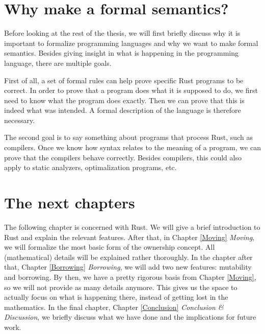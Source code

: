 \section{Why make a formal semantics?}
Before looking at the rest of the thesis, we will first briefly discuss why it is important to formalize programming languages and why we want to make formal semantics. Besides giving insight in what is happening in the programming language, there are multiple goals.

First of all, a set of formal rules can help prove specific Rust programs to be correct. In order to prove that a program does what it is supposed to do, we first need to know what the program does exactly. Then we can prove that this is indeed what was intended. A formal description of the language is therefore necessary. 

The second goal is to say something about programs that process Rust, such as compilers. Once we know how syntax relates to the meaning of a program, we can prove that the compilers behave correctly. Besides compilers, this could also apply to static analyzers, optimalization programs, etc.

\section{The next chapters}
The following chapter is concerned with Rust. We will give a brief introduction to Rust and explain the relevant features. After that, in Chapter \ref{Moving} \emph{Moving}, we will formalize the most basic form of the ownership concept. All (mathematical) details will be explained rather thoroughly. In the chapter after that, Chapter \ref{Borrowing} \emph{Borrowing}, we will add two new features: mutability and borrowing. By then, we have a pretty rigorous basis from Chapter \ref{Moving}, so we will not provide as many details anymore. This gives us the space to actually focus on what is happening there, instead of getting lost in the mathematics. In the final chapter, Chapter \ref{Conclusion} \emph{Conclusion \& Discussion}, we briefly discuss what we have done and the implications for future work. 
